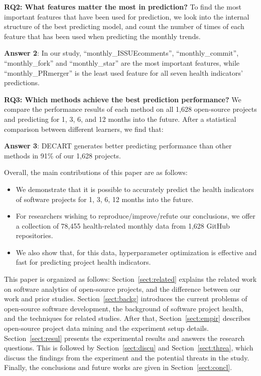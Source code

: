 \documentclass[sigconf,review,anonymous]{acmart}
\newcommand{\bi}{\begin{itemize}}
\newcommand{\ei}{\end{itemize}}
\begin{document}
\textbf{RQ2: What features matter the most in prediction?}
To find the most important features that have been used for prediction, we look into the internal structure of the best predicting model, and count the number of times of each feature that has been used when predicting the monthly trends.


\begin{blockquote}
\noindent
\textbf{Answer 2}: In our study, ``monthly\_ISSUEcomments'', ``monthly\_commit'', ``monthly\_fork'' and ``monthly\_star'' are the most important features, while ``monthly\_PRmerger'' is the least used feature for all seven health indicators' predictions.
\end{blockquote}



\textbf{RQ3: Which methods achieve the best prediction performance?}
We compare the performance results of each method on all 1,628 open-source projects and predicting for 1, 3, 6, and 12 months into the future. After a statistical comparison between different learners, we find that:  

\begin{blockquote}
\noindent
\textbf{Answer 3}: DECART generates better predicting performance than other methods in 91\% of our 1,628 projects.
\end{blockquote}



 
Overall, the main contributions of this paper are as follows:
\bi
\item  
We demonstrate that it is possible to accurately  predict the health indicators of software projects for 1, 3, 6, 12 months into the future.
\item For  researchers wishing to reproduce/improve/refute our conclusions, we offer a  collection of 78,455 health-related monthly data from 1,628 GitHub repositories. 
\item We also show that, for this data, hyperparameter optimization is effective and fast for predicting project health indicators.

\ei 
 

  
 
 
This paper is organized as follows:
Section~\ref{sect:related} explains the related work on software analytics of open-source projects, and the difference between our work and prior studies.
Section~\ref{sect:backg} introduces the current problems of open-source software development, the background of software project health, and the techniques for related studies.
After that, Section~\ref{sect:empir} describes open-source project data mining and the experiment setup details. 
Section~\ref{sect:resul} presents the experimental results and answers the research questions. 
This is followed by Section~\ref{sect:discu} and Section~\ref{sect:threa}, which discuss the findings from the experiment and the potential threats in the study. 
Finally, the conclusions and future works are given in Section~\ref{sect:concl}.
\end{document}
